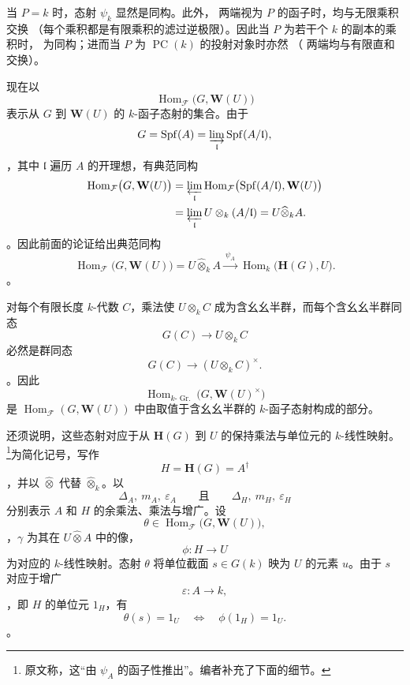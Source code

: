 当 \(P=k\) 时，态射 \(\psi_k\) 显然是同构。此外，\textup{} 两端视为 \(P\) 的函子时，均与无限乘积交换 \textup{（每个乘积都是有限乘积的滤过逆极限）}。因此当 \(P\) 为若干个 \(k\) 的副本的乘积时，\textup{} 为同构；进而当 \(P\) 为 \(\operatorname{PC}(k)\) 的投射对象时亦然 \textup{（\textup{} 两端均与有限直和交换）}。

现在以 \[
  \operatorname{Hom}_{\mathcal F}\bigl(G,\mathbf W(U)\bigr)
\] 表示从 \(G\) 到 \(\mathbf W(U)\) 的 \(k\)-函子态射的集合。由于 \[
  G=\operatorname{Spf}(A)
   =\varinjlim_{\mathfrak l}\operatorname{Spf}(A/\mathfrak l),
\]，其中 \(\mathfrak l\) 遍历 \(A\) 的开理想，有典范同构 \[
\begin{aligned}
  \operatorname{Hom}_{\mathcal F}\bigl(G,\mathbf W(U)\bigr)
  &=
  \varprojlim_{\mathfrak l}
  \operatorname{Hom}_{\mathcal F}
    \bigl(\operatorname{Spf}(A/\mathfrak l),\mathbf W(U)\bigr)
  \\
  &=
  \varprojlim_{\mathfrak l}
  U\otimes_k(A/\mathfrak l)
  =
  U\widehat\otimes_kA.
\end{aligned}
\]。因此前面的论证给出典范同构 \begin{equation}
  \operatorname{Hom}_{\mathcal F}\bigl(G,\mathbf W(U)\bigr)
  =
  U\widehat\otimes_kA
  \xrightarrow{\ \psi_A\ }
  \operatorname{Hom}_k\bigl(\mathbf H(G),U\bigr).
  \tag{2}
  \label{sga3:VIIB:2.3.2:eq2}
\end{equation}。

对每个有限长度 \(k\)-代数 \(C\)，乘法使 \(U\otimes_kC\) 成为含幺幺半群，而每个含幺幺半群同态 \[
  G(C)\longrightarrow U\otimes_kC
\] 必然是群同态 \[
  G(C)\longrightarrow(U\otimes_kC)^\times.
\]。因此 \[
  \operatorname{Hom}_{k\text{-}\operatorname{Gr.}}
    \bigl(G,\mathbf W(U)^\times\bigr)
\] 是 \(\operatorname{Hom}_{\mathcal F}(G,\mathbf W(U))\) 中由取值于含幺幺半群的 \(k\)-函子态射构成的部分。

还须说明，这些态射对应于从 \(\mathbf H(G)\) 到 \(U\) 的保持乘法与单位元的 \(k\)-线性映射。\footnote{\label{sga3:VIIB:nde:89}原文称，这“由 \(\psi_A\) 的函子性推出”。编者补充了下面的细节。}为简化记号，写作 \[
  H=\mathbf H(G)=A^\dagger
\]，并以 \(\widehat\otimes\) 代替 \(\widehat\otimes_k\)。以 \[
  \Delta_A,\ m_A,\ \varepsilon_A
  \qquad\text{且}\qquad
  \Delta_H,\ m_H,\ \varepsilon_H
\] 分别表示 \(A\) 和 \(H\) 的余乘法、乘法与增广。设 \[
  \theta\in
  \operatorname{Hom}_{\mathcal F}\bigl(G,\mathbf W(U)\bigr),
\]，\(\gamma\) 为其在 \(U\widehat\otimes A\) 中的像，\[
  \phi:H\longrightarrow U
\] 为对应的 \(k\)-线性映射。态射 \(\theta\) 将单位截面 \(s\in G(k)\) 映为 \(U\) 的元素 \(u\)。由于 \(s\) 对应于增广 \[
  \varepsilon:A\longrightarrow k,
\]，即 \(H\) 的单位元 \(1_H\)，有 \[
  \theta(s)=1_U
  \quad\Longleftrightarrow\quad
  \phi(1_H)=1_U.
\]。

